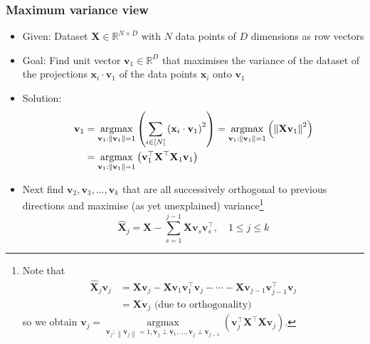 \documentclass[11pt, %
	oneside, %
	english, %
	onehalfspacing, %
	parskip, %
	]{article} %
\theoremstyle{definition}
\begin{document}
\subsubsection*{Maximum variance view}

\begin{itemize}
	\item Given: Dataset $\mathbf{X} \in \mathbb{R}^{N \times D}$ with $N$ data points of $D$ dimensions as row vectors
	\item Goal: Find unit vector $\mathbf{v}_1 \in \mathbb{R}^D$ that maximises the variance of the dataset of the projections $\mathbf{x}_i \cdot \mathbf{v}_1$ of the data points $\mathbf{x}_i$ onto $\mathbf{v}_1$
	\item Solution:
	\begin{align}
		\mathbf{v}_1&=\underset{\mathbf{v}_1:\left\|\mathbf{v}_1\right\|=1}{\operatorname{argmax}}\left(\sum_{i \in[N]}\left(\mathbf{x}_i \cdot \mathbf{v}_1\right)^2\right)=\underset{\mathbf{v}_1:\left\|\mathbf{v}_1\right\|=1}{\operatorname{argmax}}\left(\left\|\mathbf{X} \mathbf{v}_1\right\|^2\right) \notag \\
		&=\underset{\mathbf{v}_1:\left\|\mathbf{v}_1\right\|=1}{\operatorname{argmax}}\left(\mathbf{v}_1^{\top} \mathbf{X}^{\top} \mathbf{X}_1 \mathbf{v}_1\right) \label{eq.pcamaxvar}
	\end{align}
	\item Next find $\mathbf{v}_2, \mathbf{v}_3, \ldots, \mathbf{v}_k$ that are all successively orthogonal to previous directions and maximise (as yet unexplained) variance\footnote{Note that
	\begin{equation*}
		\begin{aligned}
			\widehat{\mathbf{X}}_j \mathbf{v}_j & =\mathbf{X} \mathbf{v}_j-\mathbf{X} \mathbf{v}_1 \mathbf{v}_1^{\top} \mathbf{v}_j-\cdots-\mathbf{X} \mathbf{v}_{j-1} \mathbf{v}_{j-1}^{\top} \mathbf{v}_j \\
			& =\mathbf{X} \mathbf{v}_j \text { (due to orthogonality) }
		\end{aligned}
	\end{equation*}
	so we obtain $\mathbf{v}_j =\underset{\mathbf{v}_j:\left\|\mathbf{v}_j\right\|=1, \mathbf{v}_j \perp \mathbf{v}_1, \ldots, \mathbf{v}_j \perp \mathbf{v}_{j-1}}{\operatorname{argmax}}\left(\mathbf{v}_j^{\top} \mathbf{X}^{\top} \mathbf{X} \mathbf{v}_j\right)$.
	}
	$$
	\widehat{\mathbf{X}}_j=\mathbf{X}-\sum_{s=1}^{j-1} \mathbf{X v}_s \mathbf{v}_s^{\top}, \quad 1 \leq j \leq k
	$$
\end{itemize}
\end{document}
